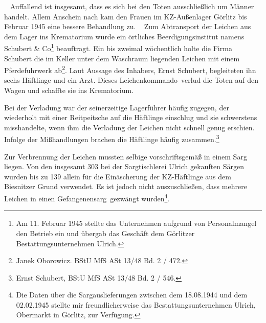 ~\newline
Auffallend ist insgesamt, dass es sich bei den Toten ausschließlich um Männer handelt. Allem Anschein nach kam den Frauen im KZ-Außenlager Görlitz bis Februar 1945 eine bessere Behandlung zu.
~\newline
Zum Abtransport der Leichen aus dem Lager ins Krematorium wurde ein örtliches Beerdigungsinstitut namens Schubert \& Co\footnote{Am 11. Februar 1945 stellte das Unternehmen aufgrund von Personalmangel den Betrieb ein und übergab das Geschäft dem Görlitzer Bestattungsunternehmen Ulrich.} beauftragt. Ein bis zweimal wöchentlich holte die Firma Schubert die im Keller unter dem Waschraum liegenden Leichen mit einem Pferdefuhrwerk ab\footnote{Janek Oborowicz. BStU MfS ASt 13/48 Bd. 2 / 472.}. Laut Aussage des Inhabers, Ernst Schubert, begleiteten ihn sechs Häftlinge und ein Arzt. Dieses \glqq Leichenkommando\grqq~verlud die Toten auf den Wagen und schaffte sie ins Krematorium. 
\begin{leftbar} 
Bei der Verladung war der seinerzeitige Lagerführer häufig zugegen, der wiederholt mit einer Reitpeitsche auf die Häftlinge einschlug und sie schwerstens misshandelte, wenn ihm die Verladung der Leichen nicht schnell genug erschien. Infolge der Mißhandlungen brachen die Häftlinge häufig zusammen.\footnote{Ernst Schubert, BStU MfS ASt 13/48 Bd. 2 / 546.}
\end{leftbar}
Zur Verbrennung der Leichen mussten selbige vorschriftsgemäß in einem Sarg liegen. Von den insgesamt 303 bei der Sargtischlerei Ulrich gekauften Särgen wurden bis zu 139 allein für die Einäscherung der KZ-Häftlinge aus dem Biesnitzer Grund verwendet. Es ist jedoch nicht auszuschließen, dass mehrere Leichen in einen \glqq Gefangenensarg\grqq~gezwängt wurden\footnote{Die Daten über die Sargauslieferungen zwischen dem 18.08.1944 und dem 02.02.1945 stellte mir freundlicherweise das Bestattungsunternehmen Ulrich, Obermarkt in Görlitz, zur Verfügung.}.


